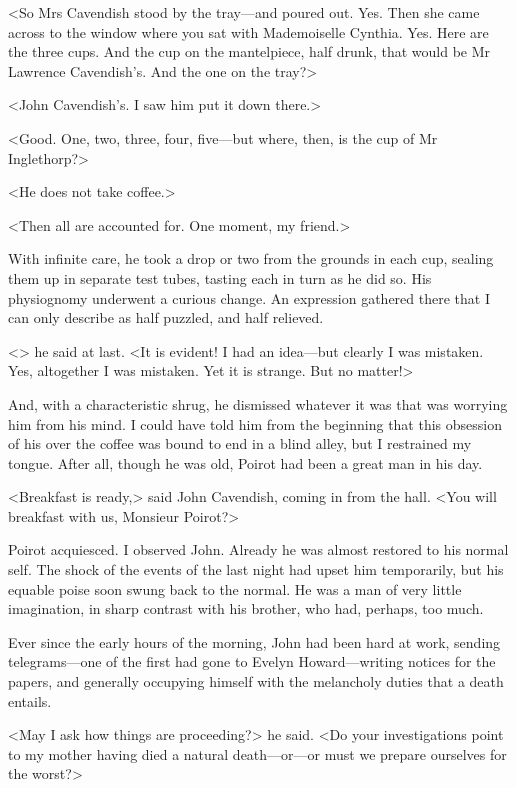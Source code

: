  <So Mrs Cavendish stood by the tray—and poured out. Yes. Then she came across to the window where you sat with Mademoiselle Cynthia. Yes. Here are the three cups. And the cup on the mantelpiece, half drunk, that would be Mr Lawrence Cavendish's. And the one on the tray?> 

 <John Cavendish's. I saw him put it down there.> 

 <Good. One, two, three, four, five—but where, then, is the cup of Mr Inglethorp?> 

 <He does not take coffee.> 

 <Then all are accounted for. One moment, my friend.> 

 With infinite care, he took a drop or two from the grounds in each cup, sealing them up in separate test tubes, tasting each in turn as he did so. His physiognomy underwent a curious change. An expression gathered there that I can only describe as half puzzled, and half relieved. 

 <> he said at last. <It is evident! I had an idea—but clearly I was mistaken. Yes, altogether I was mistaken. Yet it is strange. But no matter!> 

 And, with a characteristic shrug, he dismissed whatever it was that was worrying him from his mind. I could have told him from the beginning that this obsession of his over the coffee was bound to end in a blind alley, but I restrained my tongue. After all, though he was old, Poirot had been a great man in his day. 

 <Breakfast is ready,> said John Cavendish, coming in from the hall. <You will breakfast with us, Monsieur Poirot?> 

 Poirot acquiesced. I observed John. Already he was almost restored to his normal self. The shock of the events of the last night had upset him temporarily, but his equable poise soon swung back to the normal. He was a man of very little imagination, in sharp contrast with his brother, who had, perhaps, too much. 

 Ever since the early hours of the morning, John had been hard at work, sending telegrams—one of the first had gone to Evelyn Howard—writing notices for the papers, and generally occupying himself with the melancholy duties that a death entails. 

 <May I ask how things are proceeding?> he said. <Do your investigations point to my mother having died a natural death—or—or must we prepare ourselves for the worst?> 

